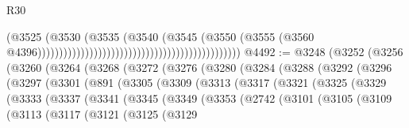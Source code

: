 \begin{lexlean}{R30}
\begin{coremodule}
                                                                                  (@3525
                                                                                    (@3530
                                                                                      (@3535
                                                                                        (@3540
                                                                                          (@3545
                                                                                            (@3550
                                                                                              (@3555
                                                                                                (@3560
                                                                                                  @4396)))))))))))))))))))))))))))))))))))))))))))))))
@4492 := @3248
    (@3252
      (@3256
        (@3260
          (@3264
            (@3268
              (@3272
                (@3276
                  (@3280
                    (@3284
                      (@3288
                        (@3292
                          (@3296
                            (@3297
                              (@3301
                                (@891
                                  (@3305
                                    (@3309
                                      (@3313
                                        (@3317
                                          (@3321
                                            (@3325
                                              (@3329
                                                (@3333
                                                  (@3337
                                                    (@3341
                                                      (@3345
                                                        (@3349
                                                          (@3353
                                                            (@2742
                                                              (@3101
                                                                (@3105
                                                                  (@3109
                                                                    (@3113
                                                                      (@3117
                                                                        (@3121
                                                                          (@3125
                                                                            (@3129

\end{coremodule}
\end{lexlean}
